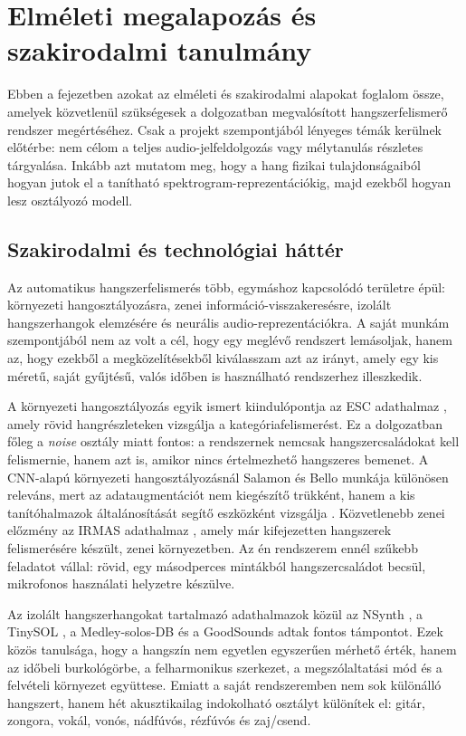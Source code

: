 \chapter{Elméleti megalapozás és szakirodalmi tanulmány}
\label{chap:elmelet}

Ebben a fejezetben azokat az elméleti és szakirodalmi alapokat foglalom össze, amelyek közvetlenül szükségesek a dolgozatban megvalósított hangszerfelismerő rendszer megértéséhez. Csak a projekt szempontjából lényeges témák kerülnek előtérbe: nem célom a teljes audio-jelfeldolgozás vagy mélytanulás részletes tárgyalása. Inkább azt mutatom meg, hogy a hang fizikai tulajdonságaiból hogyan jutok el a tanítható spektrogram-reprezentációkig, majd ezekből hogyan lesz osztályozó modell.

\section{Szakirodalmi és technológiai háttér}
\label{sec:szakirodalom}
\label{sec:technologiak}

Az automatikus hangszerfelismerés több, egymáshoz kapcsolódó területre épül: környezeti hangosztályozásra, zenei információ-visszakeresésre, izolált hangszerhangok elemzésére és neurális audio-reprezentációkra. A saját munkám szempontjából nem az volt a cél, hogy egy meglévő rendszert lemásoljak, hanem az, hogy ezekből a megközelítésekből kiválasszam azt az irányt, amely egy kis méretű, saját gyűjtésű, valós időben is használható rendszerhez illeszkedik.

A környezeti hangosztályozás egyik ismert kiindulópontja az ESC adathalmaz \cite{piczak2015esc}, amely rövid hangrészleteken vizsgálja a kategóriafelismerést. Ez a dolgozatban főleg a \textit{noise} osztály miatt fontos: a rendszernek nemcsak hangszercsaládokat kell felismernie, hanem azt is, amikor nincs értelmezhető hangszeres bemenet. A CNN-alapú környezeti hangosztályozásnál Salamon és Bello munkája különösen releváns, mert az adataugmentációt nem kiegészítő trükként, hanem a kis tanítóhalmazok általánosítását segítő eszközként vizsgálja \cite{salamon2017deep}. Közvetlenebb zenei előzmény az IRMAS adathalmaz \cite{bosch2012irmas}, amely már kifejezetten hangszerek felismerésére készült, zenei környezetben. Az én rendszerem ennél szűkebb feladatot vállal: rövid, egy másodperces mintákból hangszercsaládot becsül, mikrofonos használati helyzetre készülve.

Az izolált hangszerhangokat tartalmazó adathalmazok közül az NSynth \cite{engel2017nsynth}, a TinySOL \cite{cella2020tinysol}, a Medley-solos-DB \cite{lostanlen2018medley} és a GoodSounds \cite{romani2015good} adtak fontos támpontot. Ezek közös tanulsága, hogy a hangszín nem egyetlen egyszerűen mérhető érték, hanem az időbeli burkológörbe, a felharmonikus szerkezet, a megszólaltatási mód és a felvételi környezet együttese. Emiatt a saját rendszeremben nem sok különálló hangszert, hanem hét akusztikailag indokolható osztályt különítek el: gitár, zongora, vokál, vonós, nádfúvós, rézfúvós és zaj/csend.

